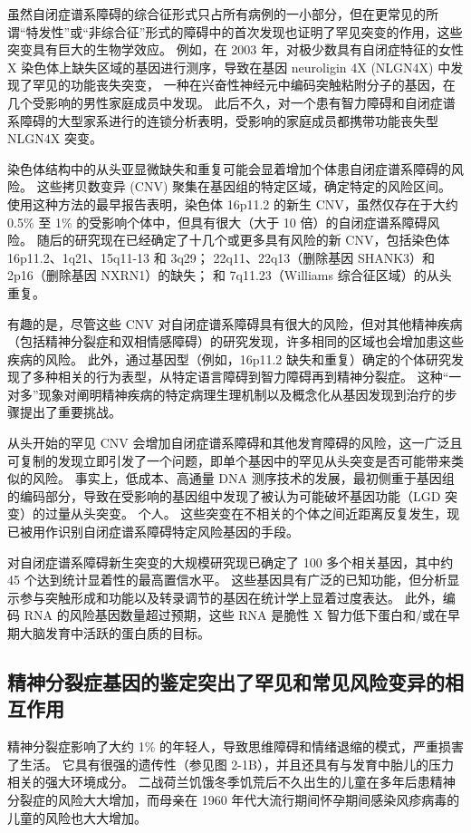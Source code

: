 虽然自闭症谱系障碍的综合征形式只占所有病例的一小部分，但在更常见的所谓“特发性”或“非综合征”形式的障碍中的首次发现也证明了罕见突变的作用，这些突变具有巨大的生物学效应。 
例如，在 2003 年，对极少数具有自闭症特征的女性 X 染色体上缺失区域的基因进行测序，导致在基因 neuroligin 4X (NLGN4X) 中发现了罕见的功能丧失突变， 一种在兴奋性神经元中编码突触粘附分子的基因，在几个受影响的男性家庭成员中发现。 
此后不久，对一个患有智力障碍和自闭症谱系障碍的大型家系进行的连锁分析表明，受影响的家庭成员都携带功能丧失型 NLGN4X 突变。


染色体结构中的从头亚显微缺失和重复可能会显着增加个体患自闭症谱系障碍的风险。 
这些拷贝数变异 (CNV) 聚集在基因组的特定区域，确定特定的风险区间。 使用这种方法的最早报告表明，染色体 16p11.2 的新生 CNV，虽然仅存在于大约 0.5\% 至 1\% 的受影响个体中，但具有很大（大于 10 倍）的自闭症谱系障碍风险。 
随后的研究现在已经确定了十几个或更多具有风险的新 CNV，包括染色体 16p11.2、1q21、15q11-13 和 3q29； 22q11、22q13（删除基因 SHANK3）和 2p16（删除基因 NXRN1）的缺失； 和 7q11.23（Williams 综合征区域）的从头重复。


有趣的是，尽管这些 CNV 对自闭症谱系障碍具有很大的风险，但对其他精神疾病（包括精神分裂症和双相情感障碍）的研究发现，许多相同的区域也会增加患这些疾病的风险。 
此外，通过基因型（例如，16p11.2 缺失和重复）确定的个体研究发现了多种相关的行为表型，从特定语言障碍到智力障碍再到精神分裂症。 
这种“一对多”现象对阐明精神疾病的特定病理生理机制以及概念化从基因发现到治疗的步骤提出了重要挑战。


从头开始的罕见 CNV 会增加自闭症谱系障碍和其他发育障碍的风险，这一广泛且可复制的发现立即引发了一个问题，即单个基因中的罕见从头突变是否可能带来类似的风险。 
事实上，低成本、高通量 DNA 测序技术的发展，最初侧重于基因组的编码部分，导致在受影响的基因组中发现了被认为可能破坏基因功能（LGD 突变）的过量从头突变。 
个人。 这些突变在不相关的个体之间近距离反复发生，现已被用作识别自闭症谱系障碍特定风险基因的手段。


对自闭症谱系障碍新生突变的大规模研究现已确定了 100 多个相关基因，其中约 45 个达到统计显着性的最高置信水平。 
这些基因具有广泛的已知功能，但分析显示参与突触形成和功能以及转录调节的基因在统计学上显着过度表达。 
此外，编码 RNA 的风险基因数量超过预期，这些 RNA 是脆性 X 智力低下蛋白和/或在早期大脑发育中活跃的蛋白质的目标。


\subsection{精神分裂症基因的鉴定突出了罕见和常见风险变异的相互作用}

精神分裂症影响了大约 1\% 的年轻人，导致思维障碍和情绪退缩的模式，严重损害了生活。 
它具有很强的遗传性（参见图 2-1B），并且还具有与发育中胎儿的压力相关的强大环境成分。 
二战荷兰饥饿冬季饥荒后不久出生的儿童在多年后患精神分裂症的风险大大增加，而母亲在 1960 年代大流行期间怀孕期间感染风疹病毒的儿童的风险也大大增加。


